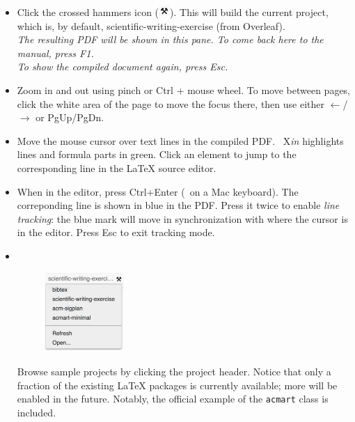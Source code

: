 \documentclass{article}
\newcommand\ToXin{\mbox{
    \raisebox{0.5pt}{T}\hspace{-.8pt}\raisebox{1pt}{o}%
    \hspace{-1pt}X{\hspace{-1pt}\itshape in}}}
\newcommand\keyplus{\raisebox{.7pt}{\fontsize{8}{8}\selectfont+}}
\newcommand\myreturn{\fontsize{9}{9}\selectfont\return}
\begin{document}
\begin{itemize}
\item Click the crossed hammers icon
 (\includegraphics[width=12pt,valign=t]{gfx/button-build.png}).
 This will build the current project,
 which is, by default, \textsf{scientific-writing-exercise} (from Overleaf). \\[.2em]
 \textit{The resulting PDF will be shown in this pane. To come back here to the manual, press {\rm F1}.}\\[.2em]
 \textit{To show the compiled document again, press {\rm Esc}.}

 
\item Zoom in and out using pinch or Ctrl + mouse wheel.
To move between pages, click the white area of the page to move the focus there,
then use either $\leftarrow$/$\rightarrow$
or PgUp/PgDn.
 
\item Move the mouse cursor over text lines in the compiled PDF.
{\ToXin} highlights lines and formula parts in green.
Click an element to jump to the corresponding line in the {\LaTeX} source editor.

\item When in the editor, press Ctrl+Enter ({\cmd\keyplus\myreturn\,} on a Mac keyboard).
The correponding line is shown in blue in the PDF.
Press it twice to enable \emph{line tracking}: the blue mark will move in synchronization with where the cursor is in the editor.
Press Esc to exit tracking mode.

\item 
\begin{minipage}[t]{4in}
~
\begin{figure}
\vspace{-3.2em}
\includegraphics[width=3cm]{gfx/project-dropdown.png}
\end{figure}
\vspace{-2.4em}

Browse sample projects by clicking the project header.
Notice that only a fraction of the existing
{\LaTeX} packages is currently available;
more will be enabled in the future.
Notably, the official example of the
\texttt{acmart} class is included.
\end{minipage}


\end{itemize}
\end{document}
